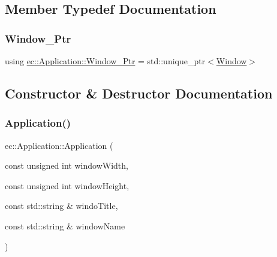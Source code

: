 \subsection{Member Typedef Documentation}
\mbox{\label{classec_1_1_application_af1e09a0f1b603eab8d3245d8b8075ad5}} 
\subsubsection{\texorpdfstring{Window\+\_\+\+Ptr}{Window\_Ptr}}
{\footnotesize\ttfamily using \mbox{\hyperlink{classec_1_1_application_af1e09a0f1b603eab8d3245d8b8075ad5}{ec\+::\+Application\+::\+Window\+\_\+\+Ptr}} =  std\+::unique\+\_\+ptr$<$\mbox{\hyperlink{classec_1_1_window}{Window}}$>$}



\subsection{Constructor \& Destructor Documentation}
\mbox{\label{classec_1_1_application_aeb940e0d02a540322cb43daa21e6e0cc}} 
\subsubsection{\texorpdfstring{Application()}{Application()}}
{\footnotesize\ttfamily ec\+::\+Application\+::\+Application (\begin{DoxyParamCaption}\item[{const unsigned int}]{window\+Width,  }\item[{const unsigned int}]{window\+Height,  }\item[{const std\+::string \&}]{windo\+Title,  }\item[{const std\+::string \&}]{window\+Name }\end{DoxyParamCaption})\hspace{0.3cm}{\ttfamily [explicit]}}

\mbox{\label{classec_1_1_application_abe00fd469062e9710bfda9f9d13765f3}} 
